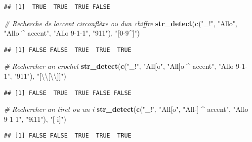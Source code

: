 \documentclass[
  11pt,
]{book}
\newenvironment{Shaded}{\begin{snugshade}}{\end{snugshade}}
\newcommand{\CharTok}[1]{\textcolor[rgb]{0.31,0.60,0.02}{#1}}
\newcommand{\CommentTok}[1]{\textcolor[rgb]{0.56,0.35,0.01}{\textit{#1}}}
\newcommand{\KeywordTok}[1]{\textcolor[rgb]{0.13,0.29,0.53}{\textbf{#1}}}
\newcommand{\NormalTok}[1]{#1}
\newcommand{\StringTok}[1]{\textcolor[rgb]{0.31,0.60,0.02}{#1}}
\numberwithin{equation}{section}
\numberwithin{countremarque}{section}
\begin{document}
\begin{lstlisting}
## [1]  TRUE  TRUE  TRUE FALSE
\end{lstlisting}

\begin{Shaded}
\begin{Highlighting}[]
\CommentTok{\# Recherche de l\textquotesingle{}accent circonflèxe ou d\textquotesingle{}un chiffre}
\KeywordTok{str\_detect}\NormalTok{(}\KeywordTok{c}\NormalTok{(}\StringTok{"\_!"}\NormalTok{, }\StringTok{"Allo"}\NormalTok{, }\StringTok{"Allo \^{} accent"}\NormalTok{, }\StringTok{"Allo 9{-}1{-}1"}\NormalTok{, }\StringTok{"911"}\NormalTok{), }\StringTok{"[0{-}9\^{}]"}\NormalTok{)}
\end{Highlighting}
\end{Shaded}

\begin{lstlisting}
## [1] FALSE FALSE  TRUE  TRUE  TRUE
\end{lstlisting}

\begin{Shaded}
\begin{Highlighting}[]
\CommentTok{\# Rechercher un crochet}
\KeywordTok{str\_detect}\NormalTok{(}\KeywordTok{c}\NormalTok{(}\StringTok{"\_!"}\NormalTok{, }\StringTok{"All[o"}\NormalTok{, }\StringTok{"All]o \^{} accent"}\NormalTok{, }\StringTok{"Allo 9{-}1{-}1"}\NormalTok{, }\StringTok{"911"}\NormalTok{), }\StringTok{"[}\CharTok{\textbackslash{}\textbackslash{}}\StringTok{[}\CharTok{\textbackslash{}\textbackslash{}}\StringTok{]]"}\NormalTok{)}
\end{Highlighting}
\end{Shaded}

\begin{lstlisting}
## [1] FALSE  TRUE  TRUE FALSE FALSE
\end{lstlisting}

\begin{Shaded}
\begin{Highlighting}[]
\CommentTok{\# Rechercher un tiret ou un i}
\KeywordTok{str\_detect}\NormalTok{(}\KeywordTok{c}\NormalTok{(}\StringTok{"\_!"}\NormalTok{, }\StringTok{"All[o"}\NormalTok{, }\StringTok{"All{-}] \^{} accent"}\NormalTok{, }\StringTok{"Allo 9{-}1{-}1"}\NormalTok{, }\StringTok{"9i11"}\NormalTok{), }\StringTok{"[{-}i]"}\NormalTok{)}
\end{Highlighting}
\end{Shaded}

\begin{lstlisting}
## [1] FALSE FALSE  TRUE  TRUE  TRUE
\end{lstlisting}
\end{document}
